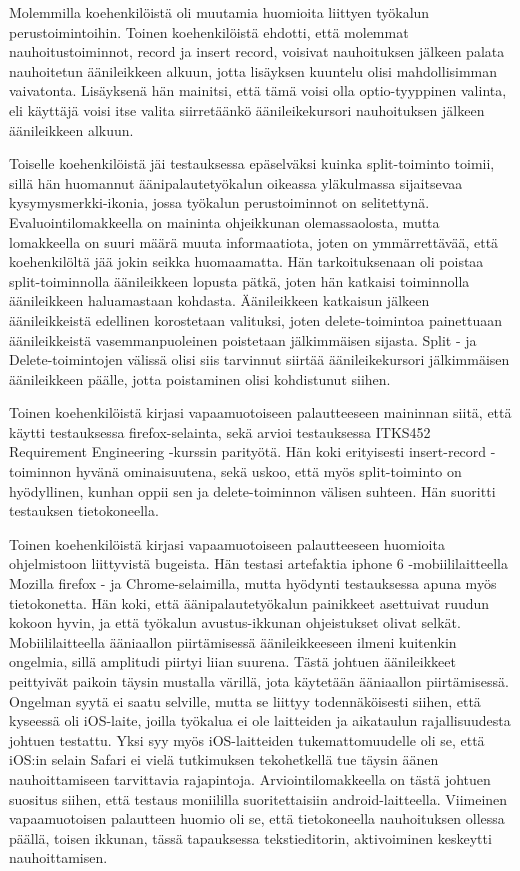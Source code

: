 \documentclass[utf8]{gradu3}
\begin{document}
Molemmilla koehenkilöistä oli muutamia huomioita liittyen työkalun perustoimintoihin. Toinen koehenkilöistä ehdotti, että molemmat nauhoitustoiminnot, record ja insert record, voisivat nauhoituksen jälkeen palata nauhoitetun äänileikkeen alkuun, jotta lisäyksen kuuntelu olisi mahdollisimman vaivatonta. Lisäyksenä hän mainitsi, että tämä voisi olla optio-tyyppinen valinta, eli käyttäjä voisi itse valita siirretäänkö äänileikekursori nauhoituksen jälkeen äänileikkeen alkuun.

Toiselle koehenkilöistä jäi testauksessa epäselväksi kuinka split-toiminto toimii, sillä hän huomannut äänipalautetyökalun oikeassa yläkulmassa sijaitsevaa kysymysmerkki-ikonia, jossa työkalun perustoiminnot on selitettynä. Evaluointilomakkeella on maininta ohjeikkunan olemassaolosta, mutta lomakkeella on suuri määrä muuta informaatiota, joten on ymmärrettävää, että koehenkilöltä jää jokin seikka huomaamatta. Hän tarkoituksenaan oli poistaa split-toiminnolla äänileikkeen lopusta pätkä, joten hän katkaisi toiminnolla äänileikkeen haluamastaan kohdasta. Äänileikkeen katkaisun jälkeen äänileikkeistä edellinen korostetaan valituksi, joten delete-toimintoa painettuaan äänileikkeistä vasemmanpuoleinen poistetaan jälkimmäisen sijasta. Split - ja Delete-toimintojen välissä olisi siis tarvinnut siirtää äänileikekursori jälkimmäisen äänileikkeen päälle, jotta poistaminen olisi kohdistunut siihen.

Toinen koehenkilöistä kirjasi vapaamuotoiseen palautteeseen maininnan siitä, että käytti testauksessa firefox-selainta, sekä arvioi testauksessa ITKS452 Requirement Engineering -kurssin parityötä. Hän koki erityisesti insert-record -toiminnon hyvänä ominaisuutena, sekä uskoo, että myös split-toiminto on hyödyllinen, kunhan oppii sen ja delete-toiminnon välisen suhteen. Hän suoritti testauksen tietokoneella.

Toinen koehenkilöistä kirjasi vapaamuotoiseen palautteeseen huomioita ohjelmistoon liittyvistä bugeista. Hän testasi artefaktia iphone 6 -mobiililaitteella Mozilla firefox - ja Chrome-selaimilla, mutta hyödynti testauksessa apuna myös tietokonetta. Hän koki, että äänipalautetyökalun painikkeet asettuivat ruudun kokoon hyvin, ja että työkalun avustus-ikkunan ohjeistukset olivat selkät. Mobiililaitteella ääniaallon piirtämisessä äänileikkeeseen ilmeni kuitenkin ongelmia, sillä amplitudi piirtyi liian suurena. Tästä johtuen äänileikkeet peittyivät paikoin täysin mustalla värillä, jota käytetään ääniaallon piirtämisessä. Ongelman syytä ei saatu selville, mutta se liittyy todennäköisesti siihen, että kyseessä oli iOS-laite, joilla työkalua ei ole laitteiden ja aikataulun rajallisuudesta johtuen testattu. Yksi syy myös iOS-laitteiden tukemattomuudelle oli se, että iOS:in selain Safari ei vielä tutkimuksen tekohetkellä tue täysin äänen nauhoittamiseen tarvittavia rajapintoja. Arviointilomakkeella on tästä johtuen suositus siihen, että testaus moniililla suoritettaisiin android-laitteella. Viimeinen vapaamuotoisen palautteen huomio oli se, että tietokoneella nauhoituksen ollessa päällä, toisen ikkunan, tässä tapauksessa tekstieditorin, aktivoiminen keskeytti nauhoittamisen.
\end{document}
